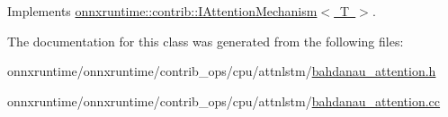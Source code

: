 Implements \mbox{\hyperlink{classonnxruntime_1_1contrib_1_1IAttentionMechanism_a74f8db1c6302b52dfea595c230ce6a69}{onnxruntime\+::contrib\+::\+I\+Attention\+Mechanism$<$ T $>$}}.



The documentation for this class was generated from the following files\+:\begin{DoxyCompactItemize}
\item 
onnxruntime/onnxruntime/contrib\+\_\+ops/cpu/attnlstm/\mbox{\hyperlink{bahdanau__attention_8h}{bahdanau\+\_\+attention.\+h}}\item 
onnxruntime/onnxruntime/contrib\+\_\+ops/cpu/attnlstm/\mbox{\hyperlink{bahdanau__attention_8cc}{bahdanau\+\_\+attention.\+cc}}\end{DoxyCompactItemize}
